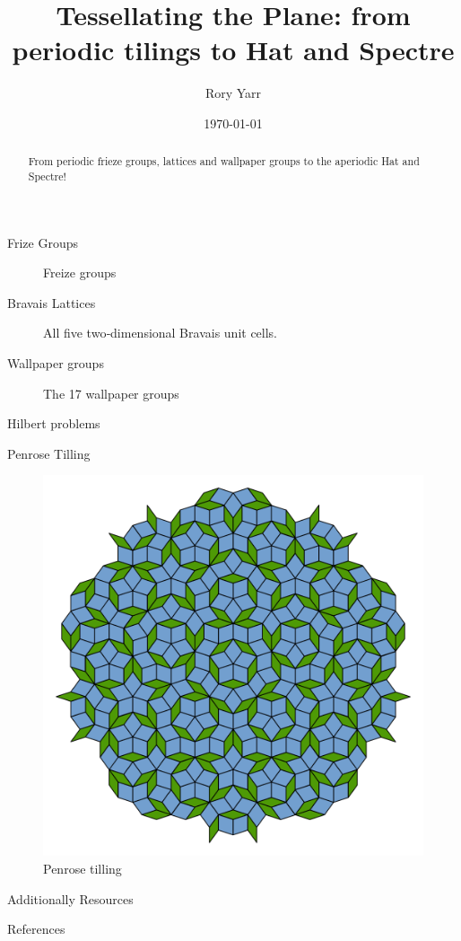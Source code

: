\documentclass{beamer}
\title[Tilling the Plane]{Tessellating the Plane: from periodic tilings to Hat and Spectre}
\author{Rory Yarr}
\date{\today}
\theoremstyle{definition}
\begin{document}
\begin{frame}
  \titlepage

  \begin{abstract}
    From periodic frieze groups, lattices and wallpaper groups to the aperiodic Hat and Spectre!
  \end{abstract}
\end{frame}

\begin{frame}{Frize Groups}
    \begin{figure}
        \centering
        
        \caption{Freize groups}
        \label{fig:Freize}
    \end{figure}
\end{frame}

\begin{frame}{Bravais Lattices}
    \begin{figure}
        \centering
        
        \caption{All five two‐dimensional Bravais unit cells.}
        \label{fig:bravis-lattices}
    \end{figure}
\end{frame}




\begin{frame}{Wallpaper groups}
    \begin{figure}
        \centering
        
        \caption{The 17 wallpaper groups }
        \label{fig:17WallpaperGroups}
    \end{figure}
\end{frame}


\begin{frame}{Hilbert problems}
    
\end{frame}

\begin{frame}{Penrose Tilling}
    \begin{figure}
        \centering
        \includegraphics[width=0.5\linewidth]{Pictures/Penrose_Tiling_(Rhombi).svg}
        \caption{Penrose tilling}
        \label{fig:penrose-rhombi}
    \end{figure}
\end{frame}

\begin{frame}{Additionally Resources}
    
\end{frame}

\begin{frame}{References}
    
\end{frame}
\end{document}
